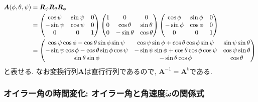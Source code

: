 \begin{align}
 \bm{A}(\phi,\theta,\psi)
 &= \bm{R}_{\psi}\bm{R}_{\theta}\bm{R}_{\phi}
 \notag
 \\
 & =
 \begin{pmatrix}
    \cos\psi & \sin\psi & 0 \\ -\sin\psi & \cos\psi & 0 \\ 0 & 0 & 1
 \end{pmatrix}
 \begin{pmatrix}
    1 & 0 & 0 \\ 0 & \cos\theta & \sin\theta \\ 0 & -\sin\theta & \cos\theta
 \end{pmatrix}
 \begin{pmatrix}
    \cos\phi & \sin\phi & 0 \\ -\sin\phi & \cos\phi & 0 \\ 0 & 0 & 1
 \end{pmatrix}
 \notag
 \\
 & =
 \begin{pmatrix}
   \cos\psi \cos\phi - \cos\theta \sin\phi \sin\psi &  \cos\psi \sin\phi + \cos\theta \cos\phi \sin\psi  & \sin\psi \sin\theta \\
  -\sin\psi \cos\phi - \cos\theta \sin\phi \cos\psi & -\sin\psi \sin\phi + \cos\theta \cos\phi \cos\psi & \cos\psi \sin\theta  \\
  \sin\theta \sin\phi & -\sin\theta\cos\phi & \cos\theta
 \end{pmatrix}
 \label{eq:RigidBodyMD4}
\end{align}
と表せる. なお変換行列$\bm{A}$は直行行列であるので, $\bm{A}^{-1} = \bm{A}^{\mathrm{t}}$である.

\subsubsection{オイラー角の時間変化: オイラー角と角速度$\tilde{\bm{\omega}}$の関係式}

